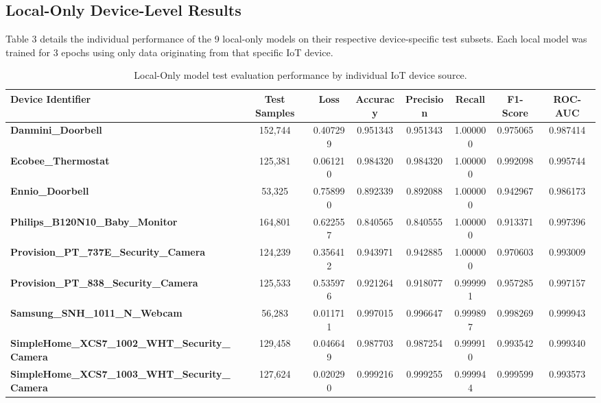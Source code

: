 \documentclass[11pt,a4paper]{article}
\begin{document}
\subsection{Local-Only Device-Level Results}
Table 3 details the individual performance of the 9 local-only models on their respective device-specific test subsets. Each local model was trained for 3 epochs using only data originating from that specific IoT device.

\begin{table}[htbp]
\centering
\caption{Local-Only model test evaluation performance by individual IoT device source.}
\begin{adjustbox}{width=\textwidth,center}
\begin{tabular}{l c c c c c c c}
\toprule
\textbf{Device Identifier} & \textbf{Test Samples} & \textbf{Loss} & \textbf{Accuracy} & \textbf{Precision} & \textbf{Recall} & \textbf{F1-Score} & \textbf{ROC-AUC} \\
\midrule
\textbf{Danmini\_Doorbell} & 152,744 & 0.407299 & 0.951343 & 0.951343 & 1.000000 & 0.975065 & 0.987414 \\
\textbf{Ecobee\_Thermostat} & 125,381 & 0.061210 & 0.984320 & 0.984320 & 1.000000 & 0.992098 & 0.995744 \\
\textbf{Ennio\_Doorbell} & 53,325 & 0.758990 & 0.892339 & 0.892088 & 1.000000 & 0.942967 & 0.986173 \\
\textbf{Philips\_B120N10\_Baby\_Monitor} & 164,801 & 0.622557 & 0.840565 & 0.840555 & 1.000000 & 0.913371 & 0.997396 \\
\textbf{Provision\_PT\_737E\_Security\_Camera} & 124,239 & 0.356412 & 0.943971 & 0.942885 & 1.000000 & 0.970603 & 0.993009 \\
\textbf{Provision\_PT\_838\_Security\_Camera} & 125,533 & 0.535976 & 0.921264 & 0.918077 & 0.999991 & 0.957285 & 0.997157 \\
\textbf{Samsung\_SNH\_1011\_N\_Webcam} & 56,283 & 0.011711 & 0.997015 & 0.996647 & 0.999897 & 0.998269 & 0.999943 \\
\textbf{SimpleHome\_XCS7\_1002\_WHT\_Security\_Camera} & 129,458 & 0.046649 & 0.987703 & 0.987254 & 0.999910 & 0.993542 & 0.999340 \\
\textbf{SimpleHome\_XCS7\_1003\_WHT\_Security\_Camera} & 127,624 & 0.020290 & 0.999216 & 0.999255 & 0.999944 & 0.999599 & 0.993573 \\
\bottomrule
\end{tabular}
\end{adjustbox}
\end{table}
\end{document}
